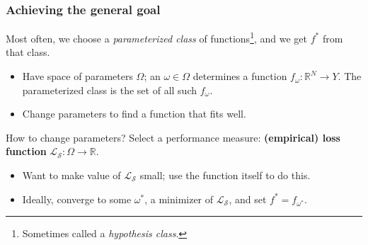 \documentclass{beamer}
\theoremstyle{example}
\begin{document}
\begin{frame}
\frametitle{Achieving the general goal}
Most often, we choose a \textit{parameterized class} of functions\footnote{Sometimes called a \textit{hypothesis class}.}, and we get $f^*$ from that class. 
\pause
\begin{itemize}
    \item Have space of parameters $\Omega$; an $\omega\in\Omega$ determines a function $f_{\omega}:\mathbb R^N \to Y$. The parameterized class is the set of all such $f_\omega$. %
    \pause
    \item Change parameters to find a function that fits well.
\end{itemize}

\pause
How to change parameters?  Select a performance measure: \textbf{(empirical) loss function} $\mathcal L_{\mathcal S}:\Omega \to \mathbb R$. %
\begin{itemize}
    \pause
    \item Want to make value of $\mathcal L_{\mathcal S}$ small; use the function itself to do this.
    \pause
    \item Ideally, converge to some $\omega^*$, a minimizer of $\mathcal L_{\mathcal S}$, and set $f^* = f_{\omega^*}$.
\end{itemize}

\end{frame}
\end{document}
